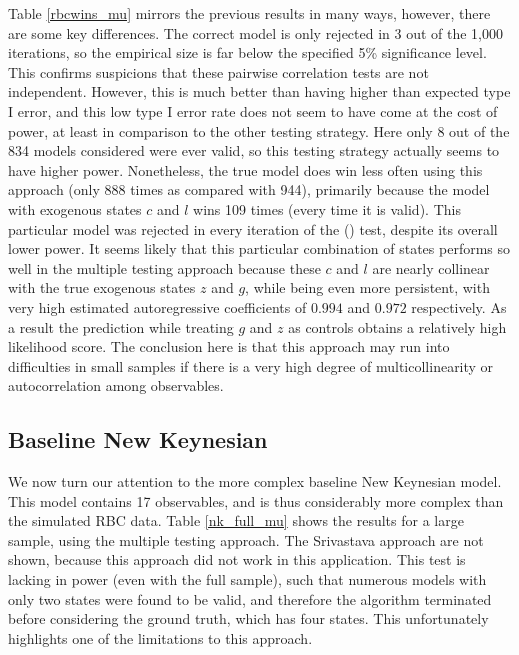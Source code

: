 \documentclass{article}
\begin{document}
Table \ref{rbcwins_mu} mirrors the previous results in many ways, however, there are some key differences. The correct model is only rejected in 3 out of the 1,000 iterations, so the empirical size is far below the specified 5\% significance level. This confirms suspicions that these pairwise correlation tests are not independent. However, this is much better than having higher than expected type I error, and this low type I error rate does not seem to have come at the cost of power, at least in comparison to the other testing strategy. Here only 8 out of the 834 models considered were ever valid, so this testing strategy actually seems to have higher power. Nonetheless, the true model does win less often using this approach (only 888 times as compared with 944), primarily because the model with exogenous states $c$ and $l$ wins 109 times (every time it is valid). This particular model was rejected in every iteration of the \citeauthor{srivastava2005some} (\citeyear{srivastava2005some}) test, despite its overall lower power. It seems likely that this particular combination of states performs so well in the multiple testing approach because these $c$ and $l$ are nearly collinear with the true exogenous states $z$ and $g$, while being even more persistent, with very high estimated autoregressive coefficients of $0.994$ and $0.972$ respectively. As a result the prediction while treating $g$ and $z$ as controls obtains a relatively high likelihood score. The conclusion here is that this approach may run into difficulties in small samples if there is a very high degree of multicollinearity or autocorrelation among observables. 

\subsection{Baseline New Keynesian} \label{nk_results}

We now turn our attention to the more complex baseline New Keynesian model. This model contains 17 observables, and is thus considerably more complex than the simulated RBC data. Table \ref{nk_full_mu} shows the results for a large sample, using the multiple testing approach. The Srivastava approach are not shown, because this approach did not work in this application. This test is lacking in power (even with the full sample), such that numerous models with only two states were found to be valid, and therefore the algorithm terminated before considering the ground truth, which has four states. This unfortunately highlights one of the limitations to this approach.
\end{document}
